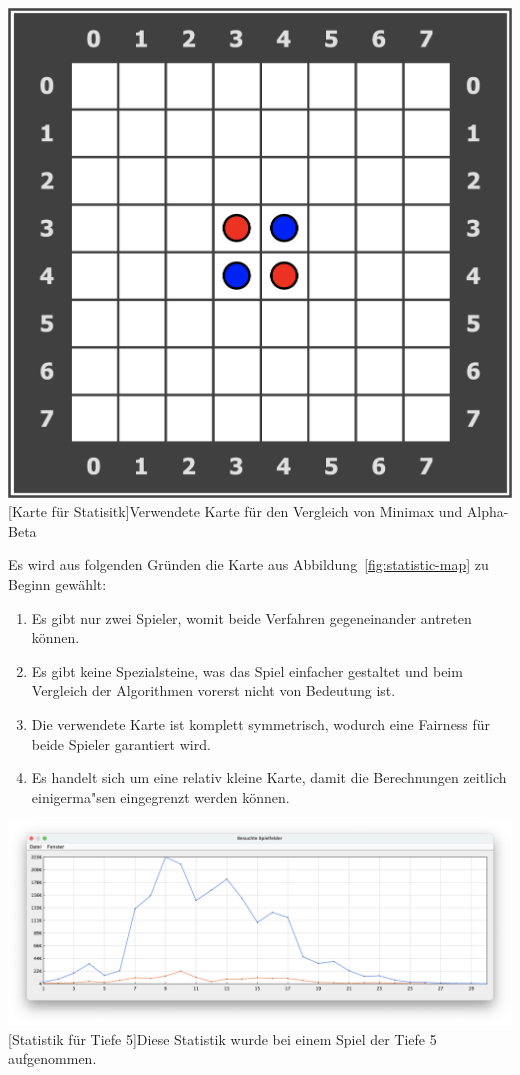 \vspace{1em}
\begin{minipage}{\linewidth}
    \centering
    \includegraphics[width=0.3\linewidth]{pics/statistic-map}
    [Karte f\"ur Statisitk]{Verwendete Karte f\"ur den Vergleich von Minimax und Alpha-Beta}
    \label{fig:statistic-map}
\end{minipage}
\vspace{1em}

Es wird aus folgenden Gr\"unden die Karte aus Abbildung~\ref{fig:statistic-map} zu Beginn gew\"ahlt:
\begin{enumerate}
    \item Es gibt nur zwei Spieler, womit beide Verfahren gegeneinander antreten k\"onnen.
    \item Es gibt keine Spezialsteine, was das Spiel einfacher gestaltet und beim Vergleich der Algorithmen vorerst nicht von Bedeutung ist.
    \item Die verwendete Karte ist komplett symmetrisch, wodurch eine Fairness f\"ur beide Spieler garantiert wird.
    \item Es handelt sich um eine relativ kleine Karte, damit die Berechnungen zeitlich einigerma"sen eingegrenzt werden k\"onnen.
\end{enumerate}

\vspace{1em}
\begin{minipage}{\linewidth}
    \centering
    \includegraphics[width=0.9\linewidth]{statistic/ORIGINAL-D5-01/ST-01-D5-LD}
    [Statistik f\"ur Tiefe 5]{Diese Statistik wurde bei einem Spiel der Tiefe 5 aufgenommen.}
    \label{fig:statistic-screen}
\end{minipage}
\vspace{1em}

